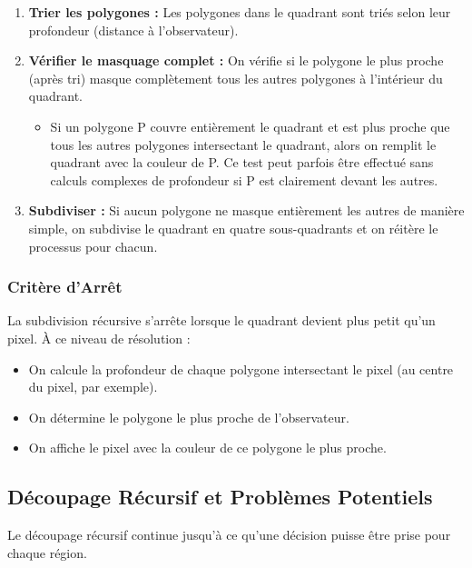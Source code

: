 \documentclass{article}
\begin{document}
\begin{enumerate}
    \item \textbf{Trier les polygones :} Les polygones dans le quadrant sont triés selon leur profondeur (distance à l'observateur).
    \item \textbf{Vérifier le masquage complet :} On vérifie si le polygone le plus proche (après tri) masque complètement tous les autres polygones à l'intérieur du quadrant.
    \begin{itemize}
        \item Si un polygone P couvre entièrement le quadrant et est plus proche que tous les autres polygones intersectant le quadrant, alors on remplit le quadrant avec la couleur de P. Ce test peut parfois être effectué sans calculs complexes de profondeur si P est clairement devant les autres.
    \end{itemize}
    \item \textbf{Subdiviser :} Si aucun polygone ne masque entièrement les autres de manière simple, on subdivise le quadrant en quatre sous-quadrants et on réitère le processus pour chacun.
\end{enumerate}

\subsubsection{Critère d'Arrêt}

La subdivision récursive s'arrête lorsque le quadrant devient plus petit qu'un pixel. À ce niveau de résolution :
\begin{itemize}
    \item On calcule la profondeur de chaque polygone intersectant le pixel (au centre du pixel, par exemple).
    \item On détermine le polygone le plus proche de l'observateur.
    \item On affiche le pixel avec la couleur de ce polygone le plus proche.
\end{itemize}

\subsection{Découpage Récursif et Problèmes Potentiels}

Le découpage récursif continue jusqu'à ce qu'une décision puisse être prise pour chaque région.
\end{document}
